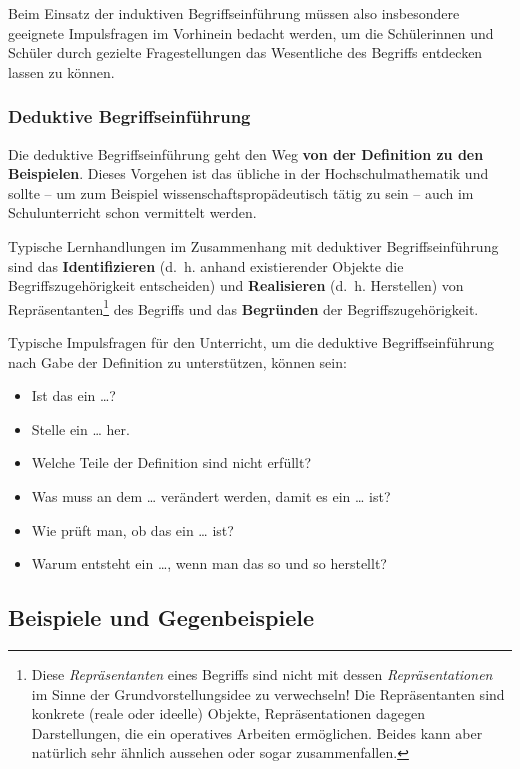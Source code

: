 \documentclass[
  ngerman,
]{scrbook}
\providecommand{\tightlist}{%
  \setlength{\itemsep}{0pt}\setlength{\parskip}{0pt}}
\theoremstyle{definition}
\theoremstyle{definition}
\theoremstyle{definition}
\theoremstyle{definition}
\theoremstyle{remark}
\begin{document}
Beim Einsatz der induktiven Begriffseinführung müssen also insbesondere geeignete Impulsfragen im Vorhinein bedacht werden, um die Schülerinnen und Schüler durch gezielte Fragestellungen das Wesentliche des Begriffs entdecken lassen zu können.

\hypertarget{deduktive-begriffseinfuxfchrung}{%
\subsubsection{Deduktive Begriffseinführung}\label{deduktive-begriffseinfuxfchrung}}

Die deduktive Begriffseinführung geht den Weg \textbf{von der Definition zu den Beispielen}. Dieses Vorgehen ist das übliche in der Hochschulmathematik und sollte -- um zum Beispiel wissenschaftspropädeutisch tätig zu sein -- auch im Schulunterricht schon vermittelt werden.

Typische Lernhandlungen im Zusammenhang mit deduktiver Begriffseinführung sind das \textbf{Identifizieren} (d.~h. anhand existierender Objekte die Begriffszugehörigkeit entscheiden) und \textbf{Realisieren} (d.~h. Herstellen) von Repräsentanten\footnote{Diese \emph{Repräsentanten} eines Begriffs sind nicht mit dessen \emph{Repräsentationen} im Sinne der Grundvorstellungsidee zu verwechseln! Die Repräsentanten sind konkrete (reale oder ideelle) Objekte, Repräsentationen dagegen Darstellungen, die ein operatives Arbeiten ermöglichen. Beides kann aber natürlich sehr ähnlich aussehen oder sogar zusammenfallen.} des Begriffs und das \textbf{Begründen} der Begriffszugehörigkeit.

Typische Impulsfragen für den Unterricht, um die deduktive Begriffseinführung nach Gabe der Definition zu unterstützen, können sein:

\begin{itemize}
\tightlist
\item
  Ist das ein \ldots?
\item
  Stelle ein \ldots{} her.
\item
  Welche Teile der Definition sind nicht erfüllt?
\item
  Was muss an dem \ldots{} verändert werden, damit es ein \ldots{} ist?
\item
  Wie prüft man, ob das ein \ldots{} ist?
\item
  Warum entsteht ein \ldots, wenn man das so und so herstellt?
\end{itemize}

\hypertarget{beispiele-und-gegenbeispiele}{%
\subsection{Beispiele und Gegenbeispiele}\label{beispiele-und-gegenbeispiele}}
\end{document}
